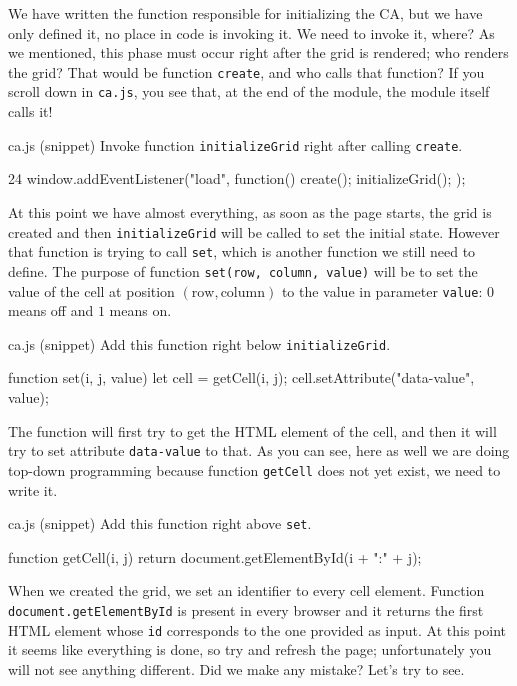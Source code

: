 We have written the function responsible for initializing the CA, but we have only defined it, no place in code
is invoking it. We need to invoke it, where? As we mentioned, this phase must occur right after the grid is
rendered; who renders the grid? That would be function \texttt{create}, and who calls that function? If you
scroll down in \texttt{ca.js}, you see that, at the end of the module, the module itself calls it!

\begin{programcode}{ca.js (snippet)}
Invoke function \texttt{initializeGrid} right after calling \texttt{create}.
\begin{codeh1}{2}{4}
window.addEventListener("load", function(){
  create();
  initializeGrid();
});
\end{codeh1}
\end{programcode}

At this point we have almost everything, as soon as the page starts, the grid is created and then
\texttt{initializeGrid} will be called to set the initial state. However that function is trying to
call \texttt{set}, which is another function we still need to define. The purpose of function
\texttt{set(row, column, value)} will be to set the value of the cell at position
$(\text{row}, \text{column})$ to the value in parameter \texttt{value}: $0$ means off and $1$ means on.

\begin{programcode}{ca.js (snippet)}
Add this function right below \texttt{initializeGrid}.
\begin{code}
function set(i, j, value) {
  let cell = getCell(i, j);
  cell.setAttribute("data-value", value);
}
\end{code}
\end{programcode}

The function will first try to get the HTML element of the cell, and then it will try to set attribute
\texttt{data-value} to that. As you can see, here as well we are doing top-down programming because
function \texttt{getCell} does not yet exist, we need to write it.

\begin{programcode}{ca.js (snippet)}
Add this function right above \texttt{set}.
\begin{code}
function getCell(i, j) {
  return document.getElementById(i + ":" + j);
}
\end{code}
\end{programcode}

When we created the grid, we set an identifier to every cell element. Function \texttt{document.getElementById}
is present in every browser and it returns the first HTML element whose \texttt{id} corresponds to the one
provided as input. At this point it seems like everything is done, so try and refresh the page; unfortunately
you will not see anything different. Did we make any mistake? Let's try to see.

